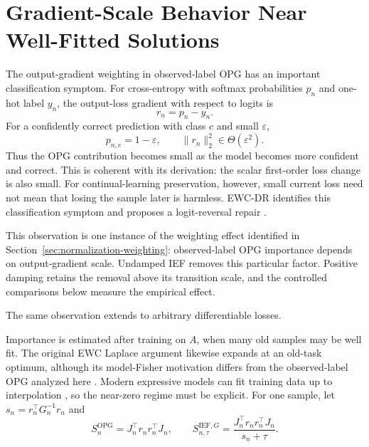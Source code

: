 \section{Gradient-Scale Behavior Near Well-Fitted Solutions}
\label{sec:well-fitted}

The output-gradient weighting in observed-label OPG has an important classification symptom. For cross-entropy with softmax probabilities $p_n$ and one-hot label $y_n$, the output-loss gradient with respect to logits is
\[
r_n=p_n-y_n.
\]
For a confidently correct prediction with class $c$ and small $\varepsilon$,
\[
p_{n,c}=1-\varepsilon,
\qquad
\|r_n\|_2^2\in\Theta(\varepsilon^2).
\]
Thus the OPG contribution becomes small as the model becomes more confident and correct. This is coherent with its derivation: the scalar first-order loss change is also small. For continual-learning preservation, however, small current loss need not mean that losing the sample later is harmless. EWC-DR identifies this classification symptom and proposes a logit-reversal repair \citep{EWC-DR}.

This observation is one instance of the weighting effect identified in Section~\ref{sec:normalization-weighting}: observed-label OPG importance depends on output-gradient scale. Undamped IEF removes this particular factor. Positive damping retains the removal above its transition scale, and the controlled comparisons below measure the empirical effect.

The same observation extends to arbitrary differentiable losses.

Importance is estimated after training on $A$, when many old samples may be well fit. The original EWC Laplace argument likewise expands at an old-task optimum, although its model-Fisher motivation differs from the observed-label OPG analyzed here \citep{EWC,KunstnerEF}. Modern expressive models can fit training data up to interpolation \citep{ModernInterp}, so the near-zero regime must be explicit. For one sample, let $s_n=r_n^\top G_n^{-1}r_n$ and
\[
S_n^{\mathrm{OPG}}=J_n^\top r_nr_n^\top J_n,
\qquad
S_{n,\tau}^{\mathrm{IEF},G}=\frac{J_n^\top r_nr_n^\top J_n}{s_n+\tau}.
\]

